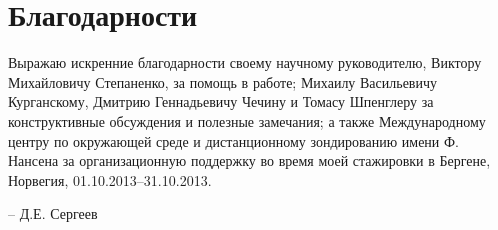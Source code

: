 \chapter*{Благодарности}

Выражаю искренние благодарности своему научному руководителю, Виктору Михайловичу Степаненко, за помощь в работе; Михаилу Васильевичу Курганскому, Дмитрию Геннадьевичу Чечину и Томасу Шпенглеру за конструктивные обсуждения и полезные замечания; а также Международному центру по окружающей среде и дистанционному зондированию имени Ф. Нансена за организационную поддержку во время моей стажировки в Бергене, Норвегия, 01.10.2013--31.10.2013.

\medskip\hfill -- Д.Е. Сергеев

